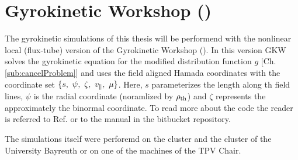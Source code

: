\section{Gyrokinetic Workshop ({\gkw})}
\label{sec:gkw}

The gyrokinetic simulations of this thesis will be performend with the nonlinear local (flux-tube) version of the Gyrokinetic Workshop ({\gkw}). In this version GKW solves the gyrokinetic equation for the modified distribution function $g$ [Ch. \ref{sub:cancelProblem}] and uses the field aligned Hamada coordinates\cite{Hamada1962} with the coordinate set $\{s,~\psi,~\zeta,~v_\parallel,~\mu\}$. Here, $s$ parameterizes the length along th field lines, $\psi$ is the radial coordinate (noramlized by $\rho_{\mathrm{th}}$) and $\zeta$ represents the approximately the binormal coordinate. To read more about the code {\gkw} the reader is referred to Ref.  or to the manual\cite{GKWManual} in the bitbucket repository.

The simulations itself were perforemd on the \cite{emil} cluster and the cluster \cite{festus} of the University Bayreuth or on one of the  machines of the TPV Chair. 

\newpage